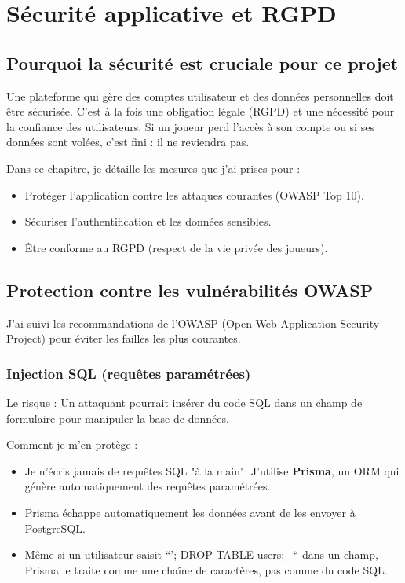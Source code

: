 \chapter{Sécurité applicative et RGPD}

\section{Pourquoi la sécurité est cruciale pour ce projet}

Une plateforme qui gère des comptes utilisateur et des données personnelles doit être sécurisée. C'est à la fois une obligation légale (RGPD) et une nécessité pour la confiance des utilisateurs. Si un joueur perd l'accès à son compte ou si ses données sont volées, c'est fini : il ne reviendra pas.

Dans ce chapitre, je détaille les mesures que j'ai prises pour :
\begin{itemize}
    \item Protéger l'application contre les attaques courantes (OWASP Top 10).
    \item Sécuriser l'authentification et les données sensibles.
    \item Être conforme au RGPD (respect de la vie privée des joueurs).
\end{itemize}

\section{Protection contre les vulnérabilités OWASP}

J'ai suivi les recommandations de l'OWASP (Open Web Application Security Project) pour éviter les failles les plus courantes.

\subsection{Injection SQL (requêtes paramétrées)}

Le risque : Un attaquant pourrait insérer du code SQL dans un champ de formulaire pour manipuler la base de données.

Comment je m'en protège :
\begin{itemize}
    \item Je n'écris jamais de requêtes SQL "à la main". J'utilise \textbf{Prisma}, un ORM qui génère automatiquement des requêtes paramétrées.
    \item Prisma échappe automatiquement les données avant de les envoyer à PostgreSQL.
    \item Même si un utilisateur saisit ``'; DROP TABLE users; --`` dans un champ, Prisma le traite comme une chaîne de caractères, pas comme du code SQL.
\end{itemize}

